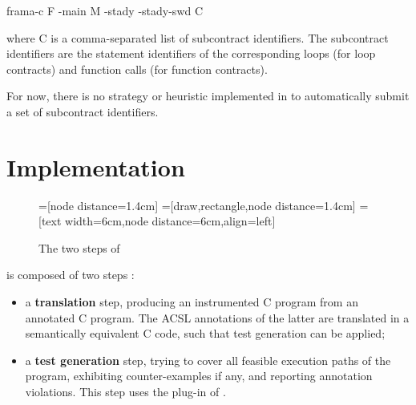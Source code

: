\documentclass[web]{frama-c-book}
\begin{document}
\begin{shell}
  frama-c F -main M -stady -stady-swd C
\end{shell}

where C is a comma-separated list of subcontract identifiers. The subcontract identifiers are the statement identifiers of the corresponding loops (for loop contracts) and function calls (for function contracts).

For now, there is no strategy or heuristic implemented in \stady to automatically submit a set of subcontract identifiers.


\chapter{Implementation}


\begin{figure}\centering
  =[node distance=1.4cm]
  =[draw,rectangle,node distance=1.4cm]
  =[text width=6cm,node distance=6cm,align=left]
  \caption{The two steps of \stady\label{fig:stady-steps}}
\end{figure}

\stady is composed of two steps :
\begin{itemize}
\item a \textbf{translation} step, producing an instrumented C program from an annotated C program. The ACSL annotations of the latter are translated in a semantically equivalent C code, such that test generation can be applied;

\item a \textbf{test generation} step, trying to cover all feasible execution paths of the program, exhibiting counter-examples if any, and reporting annotation violations. This step uses the \pathcrawler plug-in of \framac.
\end{itemize}
\end{document}
